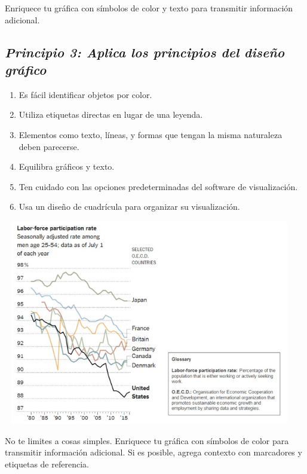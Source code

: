 \documentclass[
  letterpaper,
  DIV=11,
  numbers=noendperiod]{scrartcl}
\providecommand{\tightlist}{%
  \setlength{\itemsep}{0pt}\setlength{\parskip}{0pt}}\usepackage{longtable,booktabs,array}
\begin{document}
Enriquece tu gráfica con símbolos de color y texto para transmitir
información adicional.

\hypertarget{principio-3-aplica-los-principios-del-diseuxf1o-gruxe1fico}{%
\subsection{\texorpdfstring{\emph{Principio 3: Aplica los principios del
diseño
gráfico}}{Principio 3: Aplica los principios del diseño gráfico}}\label{principio-3-aplica-los-principios-del-diseuxf1o-gruxe1fico}}

\begin{enumerate}
\def\labelenumi{\arabic{enumi}.}
\tightlist
\item
  Es fácil identificar objetos por color.
\item
  Utiliza etiquetas directas en lugar de una leyenda.
\item
  Elementos como texto, líneas, y formas que tengan la misma naturaleza
  deben parecerse.
\item
  Equilibra gráficos y texto.
\item
  Ten cuidado con las opciones predeterminadas del software de
  visualización.
\item
  Usa un diseño de cuadrícula para organizar su visualización.
\end{enumerate}

\includegraphics[width=5.04167in,height=3.53125in]{images/clipboard-2746624499.png}

No te limites a cosas simples. Enriquece tu gráfica con símbolos de
color para transmitir información adicional. Si es posible, agrega
contexto con marcadores y etiquetas de referencia.
\end{document}
